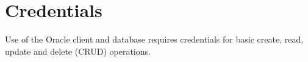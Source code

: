 
\newpage
\section{Credentials}
Use of the Oracle client and database requires credentials
for basic create, read, update and delete (CRUD) operations.\\
\\

